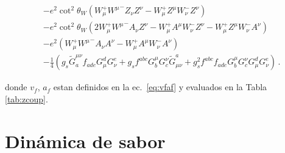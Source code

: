 \begin{frame}
\begin{align*}
&-e^2\cot^2\theta_W\left(W_\mu^+{W^\mu}^-Z_\nu Z^\nu-W_\mu^+Z^\mu W_\nu^-Z^\nu\right)\nonumber\\
&-e^2\cot^2\theta_W\left(2W_\mu^+{W^\mu}^-A_\nu Z^\nu-W_\mu^+A^\mu W_\nu^-Z^\nu-W_\mu^+Z^\mu W_\nu^-A^\nu\right)\nonumber\\
&-e^2\left(W_\mu^+{W^\mu}^-A_\nu A^\nu-W_\mu^+A^\mu W_\nu^-A^\nu\right)\nonumber\\
&- \frac{1}{4}\left(g_s\widetilde{G}^{\mu\nu}_af_{a d e}G^d_\mu G^e_\nu
    +g_sf^{a b c}G_b^\mu G_c^\nu\widetilde{G}_{\mu\nu}^a
    +g_s^2f^{a b c}f_{a d e}G_b^\mu G_c^\nu G^d_\mu G^e_\nu\right)\,.
\end{align*}     
\end{frame}
\noindent
donde  $v_f$, $a_f$ estan definidos en la ec.~\eqref{eq:vfaf} y evaluados en la Tabla \ref{tab:zcoup}.
\section{Dinámica de sabor}
\label{sec:dinamica-de-sabor}


